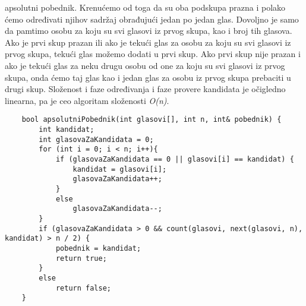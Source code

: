 \documentclass{article}
\begin{document}
apsolutni pobednik.
\newline Krenućemo od toga da su oba podskupa prazna i polako
ćemo određivati njihov sadržaj obrađujući jedan po jedan glas. Dovoljno je samo
da pamtimo osobu za koju su svi glasovi iz prvog skupa, kao i broj tih glasova.
Ako je prvi skup prazan ili ako je tekući glas za osobu za koju su svi glasovi iz
prvog skupa, tekući glas možemo dodati u prvi skup. Ako prvi skup nije prazan i ako je tekući glas za neku drugu
osobu od one za koju su svi glasovi iz prvog skupa, onda ćemo taj glas kao i
jedan glas za osobu iz prvog skupa prebaciti u drugi skup. Složenost i faze određivanja i faze provere kandidata je očigledno linearna, pa
je ceo algoritam složenosti \textit{O(n)}.
\newline
\begin{lstlisting}
    bool apsolutniPobednik(int glasovi[], int n, int& pobednik) {
        int kandidat;
        int glasovaZaKandidata = 0;
        for (int i = 0; i < n; i++){
            if (glasovaZaKandidata == 0 || glasovi[i] == kandidat) {
                kandidat = glasovi[i];
                glasovaZaKandidata++;
            } 
            else
                glasovaZaKandidata--;
        }
        if (glasovaZaKandidata > 0 && count(glasovi, next(glasovi, n), kandidat) > n / 2) {
            pobednik = kandidat;
            return true;
        }
        else
            return false;
    }
\end{lstlisting}
\end{document}

